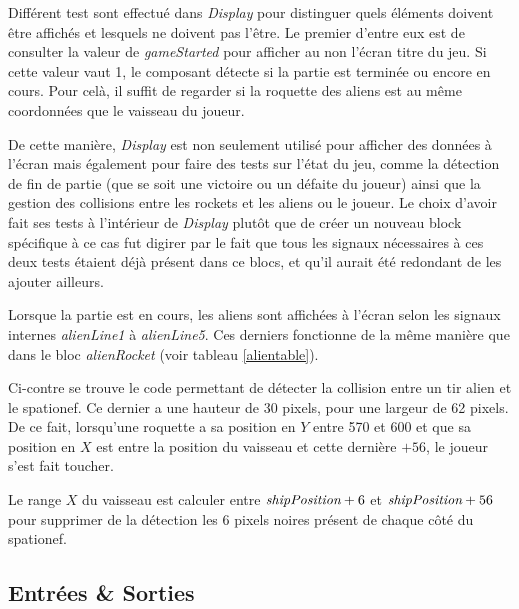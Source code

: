 \documentclass[french]{nakrule}
\begin{document}
Différent test sont effectué dans \emph{Display} pour distinguer quels éléments
doivent être affichés et lesquels ne doivent pas l'être. Le premier d'entre eux
est de consulter la valeur de \emph{gameStarted} pour afficher au non l'écran
titre du jeu. Si cette valeur vaut 1, le composant détecte si la partie est
terminée ou encore en cours. Pour celà, il suffit de regarder si la roquette des
aliens est au même coordonnées que le vaisseau du joueur.

De cette manière, \emph{Display} est non seulement utilisé pour afficher des
données à l'écran mais également pour faire des tests sur l'état du jeu, comme
la détection de fin de partie (que se soit une victoire ou un défaite du
joueur) ainsi que la gestion des collisions entre les rockets et les aliens ou
le joueur. Le choix d'avoir fait ses tests à l'intérieur de \emph{Display} plutôt
que de créer un nouveau block spécifique à ce cas fut digirer par le fait que
tous les signaux nécessaires à ces deux tests étaient déjà présent dans ce
blocs, et qu'il aurait été redondant de les ajouter ailleurs.

\begin{figure}

\end{figure}

Lorsque la partie est en cours, les aliens sont affichées à l'écran selon les
signaux internes \emph{alienLine1} à \emph{alienLine5}. Ces derniers
fonctionne de la même manière que dans le bloc \emph{alienRocket} (voir
tableau \ref{alientable}).

Ci-contre se trouve le code permettant de détecter la collision entre un tir
alien et le spationef. Ce dernier a une hauteur de 30 pixels, pour une largeur
de 62 pixels. De ce fait, lorsqu'une roquette a sa position en $Y$ entre 570
et 600 et que sa position en $X$ est entre la position du vaisseau et cette
dernière $+ 56$, le joueur s'est fait toucher.

Le range $X$ du vaisseau est calculer entre $\emph{shipPosition}+6$ et
$\emph{shipPosition}+56$ pour supprimer de la détection les 6 pixels noires
présent de chaque côté du spationef.


\clearpage

\subsection{Entrées \& Sorties}
\label{subsec:Entrees_Sorties_dmc}
\end{document}
